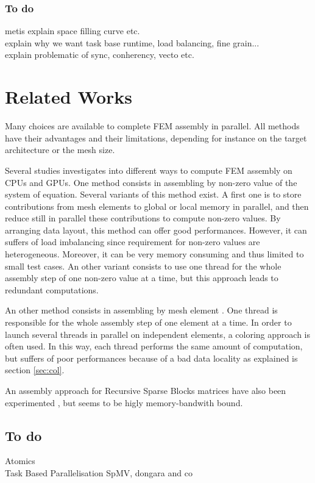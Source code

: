 \documentclass{IOS-Book-Article}
\begin{document}
\subsubsection{To do}
metis explain space filling curve etc.\\
explain why we want task base runtime, load balancing, fine grain...\\
explain problematic of sync, conherency, vecto etc.\\

\section{Related Works}
Many choices are available to complete FEM assembly in parallel.
All methods have their advantages and their limitations, depending for instance on the target architecture or the mesh size.

Several studies \cite{Stanford,CPUGPUasm} investigates into different ways to compute FEM assembly on CPUs and GPUs.
One method consists in assembling by non-zero value of the system of equation. Several variants of this method exist.
A first one is to store contributions from mesh elements to global or local memory in parallel, and then reduce still in parallel these contributions to compute non-zero values.
By arranging data layout, this method can offer good performances. However, it can suffers of load imbalancing since requirement for non-zero values are heterogeneous.
Moreover, it can be very memory consuming and thus limited to small test cases.
An other variant consists to use one thread for the whole assembly step of one non-zero value at a time, but this approach leads to redundant computations.

An other method consists in assembling by mesh element \cite{CUDAfe,CPUfe1,CPUfe2}. One thread is responsible for the whole assembly step of one element at a time.
In order to launch several threads in parallel on independent elements, a coloring approach is often used.
In this way, each thread performs the same amount of computation, but suffers of poor performances because of a bad data locality as explained is section \ref{sec:col}.

An assembly approach for Recursive Sparse Blocks matrices have also been experimented \cite{RSBasm}, but seems to be higly memory-bandwith bound.

\subsection{To do}
Atomics\\
Task Based Parallelisation SpMV, dongara and co \cite{MPI_task}\\
\end{document}
